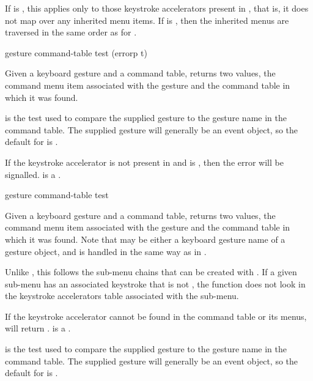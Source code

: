 If  is , this applies  only to those
keystroke accelerators present in , that is, it does not
map over any inherited menu items. If  is , then the
inherited menus are traversed in the same order as for
.


 {gesture command-table \key test (errorp t)}

Given a keyboard gesture  and a command table, returns two
values, the command menu item associated with the gesture and the command
table in which it was found.

\ReadOnly

 is the test used to compare the supplied gesture to the gesture name
in the command table.  The supplied gesture will generally be an event object,
so the default for  is .

If the keystroke accelerator is not present in  and
 is , then the  error will
be signalled.   is a .

 {gesture command-table \key test}

Given a keyboard gesture  and a command table, returns two values,
the command menu item associated with the gesture and the command table in which
it was found.  Note that  may be either a keyboard gesture name of
a gesture object, and is handled in the same way as in .

\ReadOnly

Unlike , this follows the sub-menu chains that can be
created with . If a given sub-menu has an
associated keystroke that is not , the function does not look in
the keystroke accelerators table associated with the sub-menu.

If the keystroke accelerator cannot be found in the command table or its
menus,  will return .  is
a .

 is the test used to compare the supplied gesture to the gesture name
in the command table.  The supplied gesture will generally be an event object,
so the default for  is .

